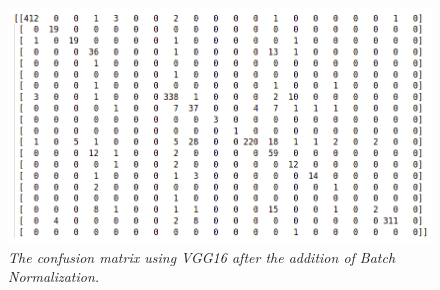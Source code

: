 \documentclass[12pt,a4paper]{report}
\begin{document}
\begin{figure}[H]
\centering
\includegraphics[scale=0.4]{./immagini/vgg16/2_data_augmentation_-_30_epochs_no_stopping_-_dropout_0p5_-_classifier_batch_norm/cm_num.png}
\caption{\textit{The confusion matrix using VGG16 after the addition of Batch Normalization.}}
\end{figure}
\end{document}
